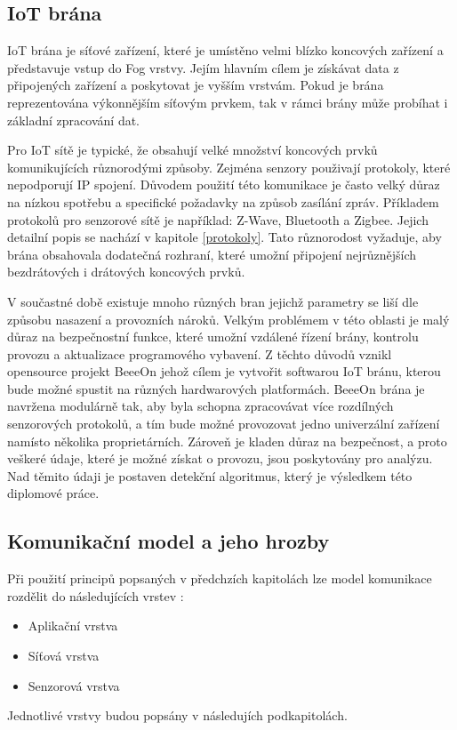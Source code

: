  \subsection{IoT brána} 
 IoT brána je síťové zařízení, které je umístěno velmi blízko koncových zařízení
 a představuje vstup do Fog vrstvy. Jejím hlavním cílem je získávat data 
 z připojených zařízení a poskytovat je vyšším vrstvám. Pokud je brána reprezentována
 výkonnějším síťovým prvkem, tak v rámci brány může probíhat i základní zpracování
 dat. 
 
 Pro IoT sítě je typické, že obsahují velké množství koncových prvků komunikujících
 různorodými způsoby. Zejména senzory použivají protokoly, které nepodporují
 IP spojení. Důvodem použití této komunikace je často velký
 důraz na nízkou spotřebu a specifické požadavky na způsob zasílání zpráv.
 Příkladem protokolů pro senzorové sítě je například:
 Z-Wave, Bluetooth a Zigbee. Jejich detailní popis se nachází v kapitole \ref{protokoly}.
 Tato různorodost vyžaduje, aby brána obsahovala dodatečná rozhraní, které 
 umožní připojení nejrůznějších bezdrátových i drátových koncových prvků. 
 
 V součastné době existuje mnoho různých bran jejichž parametry se liší dle 
 způsobu nasazení a provozních nároků. Velkým problémem v této oblasti je malý 
 důraz na bezpečnostní funkce, které umožní vzdálené řízení brány, kontrolu provozu a 
 aktualizace programového vybavení. Z těchto důvodů vznikl opensource projekt BeeeOn \cite{beeeon}
 jehož cílem je vytvořit softwarou IoT bránu, kterou bude možné spustit na různých 
 hardwarových platformách. BeeeOn brána je navržena modulárně tak, aby byla schopna 
 zpracovávat více rozdílných senzorových protokolů, a tím bude možné provozovat jedno
 univerzální zařízení namísto několika proprietárních. Zároveň je kladen důraz na bezpečnost, 
 a proto veškeré údaje, které je možné získat o provozu, jsou poskytovány pro analýzu. Nad těmito údaji
 je postaven detekční algoritmus, který je výsledkem této diplomové práce.
 

 \subsection{Komunikační model a jeho hrozby}
 Při použití principů popsaných v předchzích kapitolách lze model komunikace rozdělit
 do následujících vrstev \cite{iotSurvey}:
 \begin{itemize}
 \item Aplikační vrstva 
 \item Síťová vrstva
 \item Senzorová vrstva
\end{itemize}
 Jednotlivé vrstvy budou popsány v následujích podkapitolách.
 
